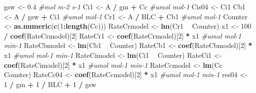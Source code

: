 \documentclass[
]{krantz}
\makeatletter
\newenvironment{Shaded}{\begin{snugshade}}{\end{snugshade}}
\newcommand{\CommentTok}[1]{\textcolor[rgb]{0.56,0.35,0.01}{\textit{#1}}}
\newcommand{\DecValTok}[1]{\textcolor[rgb]{0.00,0.00,0.81}{#1}}
\newcommand{\FloatTok}[1]{\textcolor[rgb]{0.00,0.00,0.81}{#1}}
\newcommand{\KeywordTok}[1]{\textcolor[rgb]{0.13,0.29,0.53}{\textbf{#1}}}
\newcommand{\NormalTok}[1]{#1}
\newcommand{\OperatorTok}[1]{\textcolor[rgb]{0.81,0.36,0.00}{\textbf{#1}}}
\newcommand{\StringTok}[1]{\textcolor[rgb]{0.31,0.60,0.02}{#1}}
\newenvironment{kframe}{%
\medskip{}
\setlength{\fboxsep}{.8em}
 \def\at@end@of@kframe{}%
 \ifinner\ifhmode%
  \def\at@end@of@kframe{\end{minipage}}%
  \begin{minipage}{\columnwidth}%
 \fi\fi%
 \def\FrameCommand##1{\hskip\@totalleftmargin \hskip-\fboxsep
 \colorbox{shadecolor}{##1}\hskip-\fboxsep
     \hskip-\linewidth \hskip-\@totalleftmargin \hskip\columnwidth}%
 \MakeFramed {\advance\hsize-\width
   \@totalleftmargin\z@ \linewidth\hsize
   \@setminipage}}%
 {\par\unskip\endMakeFramed%
 \at@end@of@kframe}
\renewenvironment{Shaded}{\begin{kframe}}{\end{kframe}}
\makeatother
\begin{document}
\begin{Shaded}
\begin{Highlighting}[]
\NormalTok{gsw <-}\StringTok{ }\FloatTok{0.4} \CommentTok{#mol m-2 s-1}
\NormalTok{Ci1 <-}\StringTok{ }\NormalTok{A }\OperatorTok{/}\StringTok{ }\NormalTok{gm }\OperatorTok{+}\StringTok{ }\NormalTok{Cc }\CommentTok{#umol mol-1}
\NormalTok{Cis04 <-}\StringTok{ }\NormalTok{Ci1}
\NormalTok{Cb1 <-}\StringTok{ }\NormalTok{A }\OperatorTok{/}\StringTok{ }\NormalTok{gsw }\OperatorTok{+}\StringTok{ }\NormalTok{Ci1 }\CommentTok{#umol mol-1}
\NormalTok{Cr1 <-}\StringTok{ }\NormalTok{A }\OperatorTok{/}\StringTok{ }\NormalTok{BLC }\OperatorTok{+}\StringTok{ }\NormalTok{Cb1 }\CommentTok{#umol mol-1}
\NormalTok{Counter <-}\StringTok{ }\KeywordTok{as.numeric}\NormalTok{(}\KeywordTok{c}\NormalTok{(}\DecValTok{1}\OperatorTok{:}\KeywordTok{length}\NormalTok{(Cc)))}
\NormalTok{RateCrmodel <-}\StringTok{ }\KeywordTok{lm}\NormalTok{(Cr1 }\OperatorTok{~}\StringTok{ }\NormalTok{Counter)}
\NormalTok{x1 <-}\StringTok{ }\DecValTok{100} \OperatorTok{/}\StringTok{ }\KeywordTok{coef}\NormalTok{(RateCrmodel)[}\DecValTok{2}\NormalTok{] }
\NormalTok{RateCr1 <-}\StringTok{ }\KeywordTok{coef}\NormalTok{(RateCrmodel)[}\DecValTok{2}\NormalTok{] }\OperatorTok{*}\StringTok{ }\NormalTok{x1 }\CommentTok{#umol mol-1 min-1}
\NormalTok{RateCbmodel <-}\StringTok{ }\KeywordTok{lm}\NormalTok{(Cb1 }\OperatorTok{~}\StringTok{ }\NormalTok{Counter)}
\NormalTok{RateCb1 <-}\StringTok{ }\KeywordTok{coef}\NormalTok{(RateCbmodel)[}\DecValTok{2}\NormalTok{] }\OperatorTok{*}\StringTok{ }\NormalTok{x1 }\CommentTok{#umol mol-1 min-1}
\NormalTok{RateCimodel <-}\StringTok{ }\KeywordTok{lm}\NormalTok{(Ci1 }\OperatorTok{~}\StringTok{ }\NormalTok{Counter)}
\NormalTok{RateCi1 <-}\StringTok{ }\KeywordTok{coef}\NormalTok{(RateCimodel)[}\DecValTok{2}\NormalTok{] }\OperatorTok{*}\StringTok{ }\NormalTok{x1 }\CommentTok{#umol mol-1 min-1}
\NormalTok{RateCcmodel <-}\StringTok{ }\KeywordTok{lm}\NormalTok{(Cc }\OperatorTok{~}\StringTok{ }\NormalTok{Counter)}
\NormalTok{RateCc04 <-}\StringTok{ }\KeywordTok{coef}\NormalTok{(RateCcmodel)[}\DecValTok{2}\NormalTok{] }\OperatorTok{*}\StringTok{ }\NormalTok{x1 }\CommentTok{#umol mol-1 min-1}
\NormalTok{res04 <-}\StringTok{ }\DecValTok{1} \OperatorTok{/}\StringTok{ }\NormalTok{gm }\OperatorTok{+}\StringTok{ }\DecValTok{1} \OperatorTok{/}\StringTok{ }\NormalTok{BLC }\OperatorTok{+}\StringTok{ }\DecValTok{1} \OperatorTok{/}\StringTok{ }\NormalTok{gsw}


\end{Highlighting}
\end{Shaded}
\end{document}
